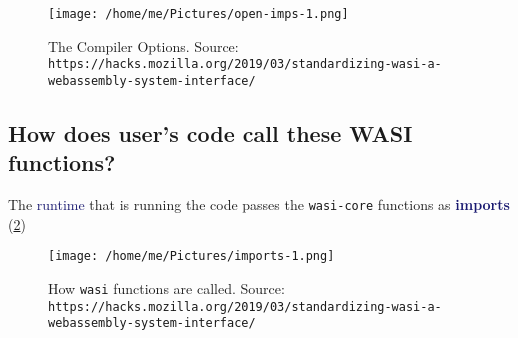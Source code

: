 \documentclass[dvipsnames]{article}
\newcommand{\mycola}{MidnightBlue}
\newcommand{\cola}[1]{\textcolor{\mycola}{#1}}
\newcommand{\Cola}[1]{\textcolor{\mycola}{\textbf{#1}}}
\begin{document}
\begin{figure}[ht]
  \centering
  \texttt{[image: /home/me/Pictures/open-imps-1.png]}
  \caption{The Compiler Options. Source:
    \texttt{https://hacks.mozilla.org/2019/03/standardizing-wasi-a-webassembly-system-interface/}}
  \label{fig:libc}
\end{figure}

\subsection{How does user's code call these WASI functions?}

The \cola{runtime} that is running the code passes the \texttt{wasi-core} functions as \Cola{imports} (\cref{fig:imports})
\begin{figure}[ht]
  \centering
  \texttt{[image: /home/me/Pictures/imports-1.png]}
  \caption{How \texttt{wasi} functions are called. Source:
  \texttt{https://hacks.mozilla.org/2019/03/standardizing-wasi-a-webassembly-system-interface/}}
  \label{fig:imports}
\end{figure}

\end{document}
